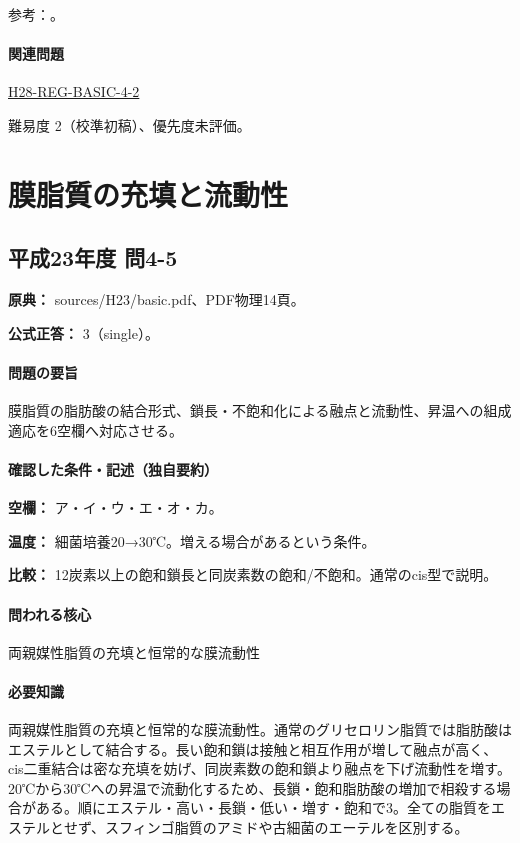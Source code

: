 \par 参考：\cite{iupac_isotopes}。

\paragraph{関連問題} \hyperref[q:h28-reg-basic-4-2]{H28-REG-BASIC-4-2}

\par 難易度 2（校準初稿）、優先度未評価。

\section{膜脂質の充填と流動性}

\subsection{平成23年度 問4-5}
\label{q:h23-reg-basic-4-5}

\noindent\textbf{原典：} sources/H23/basic.pdf、PDF物理14頁。

\textbf{公式正答：} 3（single）。

\paragraph{問題の要旨} 膜脂質の脂肪酸の結合形式、鎖長・不飽和化による融点と流動性、昇温への組成適応を6空欄へ対応させる。

\paragraph{確認した条件・記述（独自要約）}\mbox{}\par

\noindent\textbf{空欄：} ア・イ・ウ・エ・オ・カ。\par

\noindent\textbf{温度：} 細菌培養20→30℃。増える場合があるという条件。\par

\noindent\textbf{比較：} 12炭素以上の飽和鎖長と同炭素数の飽和/不飽和。通常のcis型で説明。\par

\paragraph{問われる核心} 両親媒性脂質の充填と恒常的な膜流動性

\paragraph{必要知識} 両親媒性脂質の充填と恒常的な膜流動性。通常のグリセロリン脂質では脂肪酸はエステルとして結合する。長い飽和鎖は接触と相互作用が増して融点が高く、cis二重結合は密な充填を妨げ、同炭素数の飽和鎖より融点を下げ流動性を増す。20℃から30℃への昇温で流動化するため、長鎖・飽和脂肪酸の増加で相殺する場合がある。順にエステル・高い・長鎖・低い・増す・飽和で3。全ての脂質をエステルとせず、スフィンゴ脂質のアミドや古細菌のエーテルを区別する。


